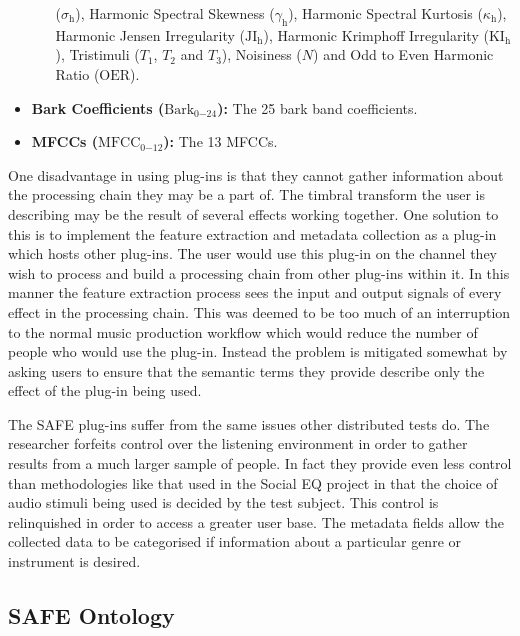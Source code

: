 \begin{itemize}
\begin{itemize}
				      ($\sigma_{\mathrm{h}}$), Harmonic Spectral Skewness ($\gamma_{\mathrm{h}}$), Harmonic
				      Spectral Kurtosis ($\kappa_{\mathrm{h}}$), Harmonic Jensen Irregularity
				      ($\mathrm{JI_{h}}$), Harmonic Krimphoff Irregularity
				      ($\mathrm{KI_{h}}$), Tristimuli ($T_{1}$, $T_{2}$ and $T_{3}$), Noisiness
				      ($N$) and Odd to Even Harmonic Ratio ($\mathrm{OER}$).
			\end{itemize}
			\item {\bf{Bark Coefficients (}}$\mathrm{Bark}_{0\mathrm{-}24}${\bf{):}} The 25 bark band
			      coefficients.
			\item {\bf{MFCCs (}}$\mathrm{MFCC}_{0\mathrm{-}12}${\bf{):}} The 13 MFCCs.
		\end{itemize}

		One disadvantage in using plug-ins is that they cannot gather information about the processing chain they
		may be a part of. The timbral transform the user is describing may be the result of several effects working
		together. One solution to this is to implement the feature extraction and metadata collection as a plug-in
		which hosts other plug-ins. The user would use this plug-in on the channel they wish to process and build a
		processing chain from other plug-ins within it. In this manner the feature extraction process sees the
		input and output signals of every effect in the processing chain. This was deemed to be too much of an
		interruption to the normal music production workflow which would reduce the number of people who would use
		the plug-in. Instead the problem is mitigated somewhat by asking users to ensure that the semantic terms
		they provide describe only the effect of the plug-in being used.

		The SAFE plug-ins suffer from the same issues other distributed tests do. The researcher forfeits control
		over the listening environment in order to gather results from a much larger sample of people. In fact they
		provide even less control than methodologies like that used in the Social EQ project
		\citep{cartwright2013socialeq} in that the choice of audio stimuli being used is decided by the test
		subject. This control is relinquished in order to access a greater user base. The metadata fields allow the
		collected data to be categorised if information about a particular genre or instrument is desired.

	\subsection{SAFE Ontology}
	\label{sec:TimbreEvaluation-DAWBasedTimbreEvaluation-SAFEOntology}


